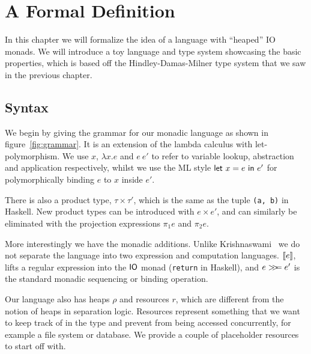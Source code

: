 \chapter{A Formal Definition} \label{chapter:system}

In this chapter we will formalize the idea of a language with
``heaped'' IO monads. We will introduce a toy language
and type system showcasing the basic properties, which is based off
the Hindley-Damas-Milner type system that we saw in the previous
chapter.

\section{Syntax}

\setlength{\grammarparsep}{20pt plus 1pt minus 1pt} %
\setlength{\grammarindent}{12em} %
\renewcommand{\syntleft}{}
\renewcommand{\syntright}{}



\def\defaultHypSeparation{\hskip .05in}

We begin by giving the grammar for our monadic language as shown in
figure~\ref{fig:grammar}.  It is an extension of the lambda calculus
with let-polymorphism.  We use $x$, $\lambda x . e$ and $e \ e'$ to refer to
variable lookup, abstraction and application respectively, whilst we
use the ML style $\mathsf{let} \ x = e \ \mathsf{in} \ e'$ for polymorphically binding $e$
to $x$ inside $e'$.

There is also a product type, $\tau \times \tau'$, which is the same as the tuple
\texttt{(a, b)} in Haskell. New product types can be introduced with
$e \times e'$, and can similarly be eliminated with the projection
expressions $\pi_1 e$ and $\pi_2 e$.

More interestingly we have the monadic additions. Unlike
Krishnaswami~\cite{krishnaswami2006} we do not separate the language
into two expression and computation languages.  $[\![ e]\!]$, lifts a
regular expression into the $\mathsf{IO}$ monad (\texttt{return} in Haskell), and
$e >\!\!>\!\!= e'$ is the standard monadic sequencing or binding operation.

Our language also has heaps $\rho$ and resources $r$, which are different from the
notion of heaps in separation logic. Resources represent something
that we want to keep track of in the type and prevent from being
accessed concurrently, for example a file system or database. We
provide a couple of placeholder resources to start off with.

